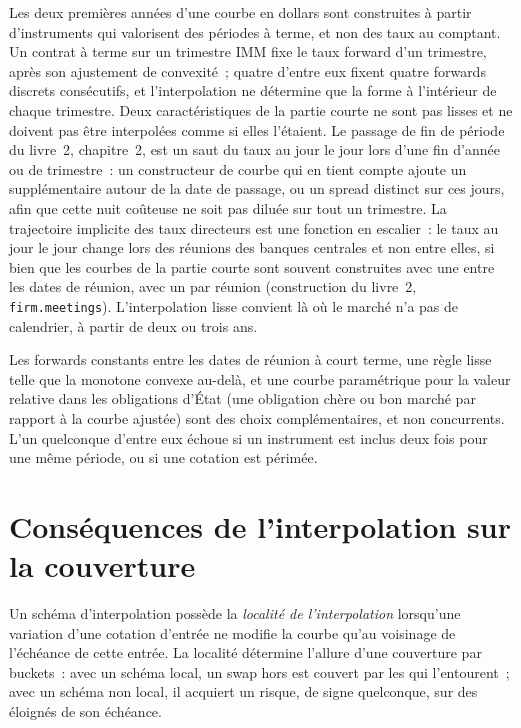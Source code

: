 Les deux premières années d'une courbe en dollars sont construites à partir d'instruments qui valorisent
des périodes à terme, et non des taux au comptant. Un contrat à terme sur un trimestre IMM fixe le
taux forward d'un trimestre, après son ajustement de convexité~; quatre d'entre eux fixent quatre
forwards discrets consécutifs, et l'interpolation ne détermine que la forme à l'intérieur de chaque
trimestre. Deux caractéristiques de la partie courte ne sont pas lisses et ne doivent pas être
interpolées comme si elles l'étaient. Le passage
de fin de période du livre~2, chapitre~2, est un saut du taux au jour le jour lors d'une fin d'année
ou de trimestre~: un constructeur de courbe qui en tient compte ajoute un  supplémentaire
autour de la date de passage, ou un spread distinct sur ces jours, afin que cette nuit coûteuse ne soit
pas diluée sur tout un trimestre. La trajectoire implicite des taux directeurs
est une fonction en escalier~: le taux au jour le jour change lors des réunions des banques centrales et non
entre elles, si bien que les courbes de la partie courte sont souvent construites avec une
 entre les dates de réunion, avec un  par réunion (construction
du livre~2, \texttt{firm.meetings}). L'interpolation lisse convient là où le marché n'a pas de
calendrier, à partir de deux ou trois ans.

\begin{remark}\label{rem:rc:curve-construction:which}
Les forwards constants entre les dates de réunion à court terme, une règle lisse telle que la
monotone convexe au-delà, et une courbe paramétrique pour la valeur relative dans les
obligations d'État (une obligation chère ou bon marché par rapport à la courbe ajustée) sont des choix complémentaires,
et non concurrents. L'un quelconque d'entre eux échoue si un instrument est inclus deux fois pour une
même période, ou si une cotation est périmée.
\end{remark}

\section{Conséquences de l'interpolation sur la couverture}

\begin{definition}\label{def:rc:curve-construction:locality}
Un schéma d'interpolation possède la \emph{localité de l'interpolation}
lorsqu'une variation d'une cotation d'entrée ne modifie la courbe qu'au voisinage de l'échéance
de cette entrée. La localité détermine l'allure d'une couverture par buckets~: avec un schéma local, un
swap hors  est couvert par les  qui l'entourent~; avec un schéma non local, il acquiert
un risque, de signe quelconque, sur des  éloignés
de son échéance.
\end{definition}


